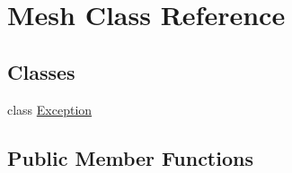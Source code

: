 \hypertarget{class_mesh}{
\section{Mesh Class Reference}
\label{class_mesh}
}
\subsection*{Classes}
\begin{DoxyCompactItemize}
\item 
class \hyperlink{class_mesh_1_1_exception}{Exception}
\end{DoxyCompactItemize}
\subsection*{Public Member Functions}
